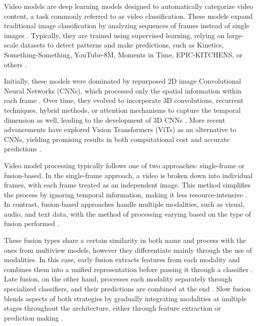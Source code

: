 Video models are deep learning models designed to automatically categorize video content, a task commonly referred to as video classification. These models expand traditional image classification by analyzing sequences of frames instead of single images \cite{electronics13142732}. Typically, they are trained using supervised learning, relying on large-scale datasets to detect patterns and make predictions, such as Kinetics, Something-Something, YouTube-8M, Moments in Time, EPIC-KITCHENS, or others  \cite{electronics13142732}.

Initially, these models were dominated by repurposed 2D image Convolutional Neural Networks (CNNs), which processed only the spatial information within each frame \cite{electronics13142732, DBLP:journals/corr/abs-2103-15691}. Over time, they evolved to incorporate 3D convolutions, recurrent techniques, hybrid methods, or attention mechanisms to capture the temporal dimension as well, leading to the development of 3D CNNs \cite{electronics13142732}. More recent advancements have explored Vision Transformers (ViTs) as an alternative to CNNs, yielding promising results in both computational cost and accurate predictions \cite{electronics13142732, DBLP:journals/corr/abs-2103-15691, DBLP:journals/corr/abs-2102-05095}.

Video model processing typically follows one of two approaches: single-frame or fusion-based. In the single-frame approach, a video is broken down into individual frames, with each frame treated as an independent image. This method simplifies the process by ignoring temporal information, making it less resource-intensive \cite{electronics13142732}. In contrast, fusion-based approaches handle multiple modalities, such as visual, audio, and text data, with the method of processing varying based on the type of fusion performed \cite{electronics13142732}.

These fusion types share a certain similarity in both name and process with the ones from multiview models, however they differentiate mainly through the use of modalities. In this case, early fusion extracts features from each modality and combines them into a unified representation before passing it through a classifier \cite{electronics13142732}. Late fusion, on the other hand, processes each modality separately through specialized classifiers, and their predictions are combined at the end \cite{electronics13142732}. Slow fusion blends aspects of both strategies by gradually integrating modalities at multiple stages throughout the architecture, either through feature extraction or prediction making \cite{electronics13142732}.